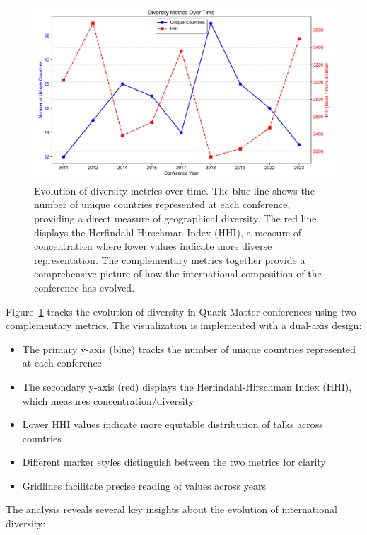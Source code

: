 \documentclass[a4paper,11pt]{article}
\begin{document}
\begin{figure}[H]
\centering
\includegraphics[width=\textwidth]{figures/diversity_metrics.pdf}
\caption{Evolution of diversity metrics over time. The blue line shows the number of unique countries represented at each conference, providing a direct measure of geographical diversity. The red line displays the Herfindahl-Hirschman Index (HHI), a measure of concentration where lower values indicate more diverse representation. The complementary metrics together provide a comprehensive picture of how the international composition of the conference has evolved.}
\label{fig:diversity_metrics}
\end{figure}

Figure~\ref{fig:diversity_metrics} tracks the evolution of diversity in Quark Matter conferences using two complementary metrics. The visualization is implemented with a dual-axis design:

\begin{itemize}
    \item The primary y-axis (blue) tracks the number of unique countries represented at each conference
    \item The secondary y-axis (red) displays the Herfindahl-Hirschman Index (HHI), which measures concentration/diversity
    \item Lower HHI values indicate more equitable distribution of talks across countries
    \item Different marker styles distinguish between the two metrics for clarity
    \item Gridlines facilitate precise reading of values across years
\end{itemize}

The analysis reveals several key insights about the evolution of international diversity:
\end{document}
